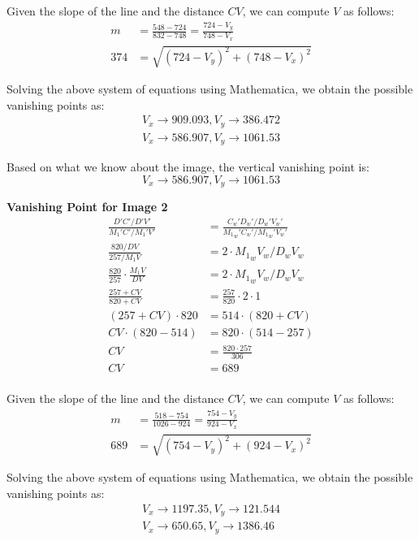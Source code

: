 \documentclass[12pt, oneside]{article}
\begin{document}
Given the slope of the line and the distance $CV$, we can compute $V$ as follows:
\begin{align}
    m &= \frac{548-724}{832-748} = \frac{724-V_y}{748 - V_x}  \\
    374 &= \sqrt{(724-V_y)^2 + (748 - V_x)^2}
\end{align}

Solving the above system of equations using Mathematica, we obtain the possible
vanishing points as:
\begin{align*}
    {V_x\to 909.093,V_y\to 386.472} \\
    {V_x\to 586.907,V_y\to 1061.53} 
\end{align*}

Based on what we know about the image, the vertical vanishing point is:
$$     {V_x\to 586.907,V_y\to 1061.53}  $$


\textbf{Vanishing Point for Image 2}
\begin{align*}
  \frac{D'C'/D'V'}{{M_1}'C'/{M_1}'V'} &= \frac{{C_w}'{D_w}'/{D_w}'{V_w}'}
                                        {{{M_1}_w}'{C_w}'/{{M_1}_w}'{V_w}'} \\
  \frac{820/DV}{257/M_1V}                 &= 2 \cdot {M_1}_wV_w/D_wV_w \\
  \frac{820}{257}\cdot \frac{M_1V}{DV}    &= 2 \cdot {M_1}_wV_w/D_wV_w \\
  \frac{257 + CV}{820 + CV}   &= \frac{257}{820}\cdot 2 \cdot 1 \\
  (257 + CV) \cdot 820   &= 514 \cdot (820 + CV) \\
  CV \cdot (820 - 514)   &= 820 \cdot (514 - 257)\\
  CV  &= \frac{820 \cdot 257} {306}\\
  CV  &= 689\\
\end{align*}

Given the slope of the line and the distance $CV$, we can compute $V$ as follows:
\begin{align}
    m &= \frac{518-754}{1026-924} = \frac{754-V_y}{924 - V_x}  \\
    689 &= \sqrt{(754-V_y)^2 + (924 - V_x)^2}
\end{align}

Solving the above system of equations using Mathematica, we obtain the possible
vanishing points as:
\begin{align*}
    {V_x\to 1197.35,V_y\to 121.544} \\
    {V_x\to 650.65,V_y\to 1386.46} 
\end{align*}
\end{document}

